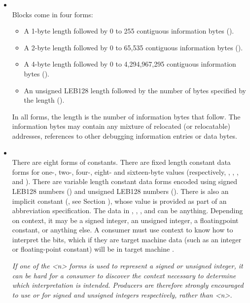 \begin{itemize}
\item \CLASSblock \\
Blocks come in four forms:
\begin{itemize}
\item
A 1-byte length followed by 0 to 255 contiguous information
bytes (\DWFORMblockoneTARG).

\item
A 2-byte length followed by 0 to 65,535 contiguous information
bytes (\DWFORMblocktwoTARG).

\item
A 4-byte length followed by 0 to 4,294,967,295 contiguous
information bytes (\DWFORMblockfourTARG).

\item
An unsigned LEB128
length followed by the number of bytes
specified by the length (\DWFORMblockTARG).
\end{itemize}

In all forms, the length is the number of information bytes
that follow. The information bytes may contain any mixture
of relocated (or relocatable) addresses, references to other
debugging information entries or data bytes.

\item \CLASSconstant \\
There are eight forms of constants. There are fixed length
constant data forms for one-, two-, four-, eight- and sixteen-byte values
(respectively, 
\DWFORMdataoneTARG, 
\DWFORMdatatwoTARG, 
\DWFORMdatafourTARG,
\DWFORMdataeightTARG{} and
\DWFORMdatasixteenTARG). 
There are variable length constant
data forms encoded using 
signed LEB128 numbers (\DWFORMsdataTARG) and unsigned 
LEB128 numbers (\DWFORMudataTARG).
There is also an implicit constant (\DWFORMimplicitconst,
\bb
see Section ),
whose value is provided as part of an abbreviation specification.
\eb
{}
The data in \DWFORMdataone, 
\DWFORMdatatwo, 
\DWFORMdatafour{}, 
\DWFORMdataeight{} and
\DWFORMdatasixteen{} 
can be anything. Depending on context, it may
be a signed integer, an unsigned integer, a floating\dash point
constant, or anything else. A consumer must use context to
know how to interpret the bits, which if they are target
machine data (such as an integer or floating-point constant)
will be in target machine \byteorder.

\textit{If one of the \DWFORMdataTARG\textless n\textgreater 
forms is used to represent a
signed or unsigned integer, it can be hard for a consumer
to discover the context necessary to determine which
interpretation is intended. Producers are therefore strongly
encouraged to use \DWFORMsdata{} or 
\DWFORMudata{} for signed and
unsigned integers respectively, rather than 
\DWFORMdata\textless n\textgreater.}


\end{itemize}
